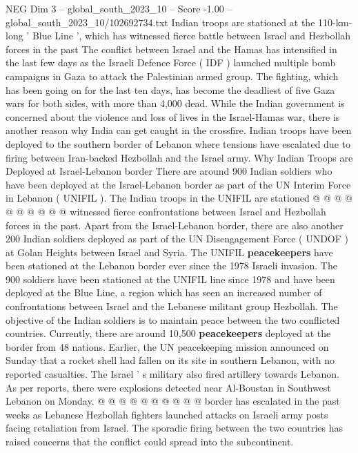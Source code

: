 \begin{textsample}{NEG Dim 3 – global\_south\_2023\_10 – Score -1.00 – global\_south\_2023\_10/102692734.txt}  \label{ex:f3_neg_021}
Indian troops are stationed at the 110-km-long ' Blue Line ', which has witnessed fierce battle between Israel and Hezbollah forces in the past The conflict between Israel and the Hamas has intensified in the last few days as the Israeli Defence Force ( IDF ) launched multiple bomb campaigns in Gaza to attack the Palestinian armed group.
The fighting, which has been going on for the last ten days, has become the deadliest of five Gaza wars for both sides, with more than 4,000 dead.
While the Indian government is concerned about the violence and loss of lives in the Israel-Hamas war, there is another reason why India can get caught in the crossfire.
Indian troops have been deployed to the southern border of Lebanon where tensions have escalated due to firing between Iran-backed Hezbollah and the Israel army.
Why Indian Troops are Deployed at Israel-Lebanon border There are around 900 Indian soldiers who have been deployed at the Israel-Lebanon border as part of the UN Interim Force in Lebanon ( UNIFIL ).
The Indian troops in the UNIFIL are stationed @ @ @ @ @ @ @ @ @ @ witnessed fierce confrontations between Israel and Hezbollah forces in the past.
Apart from the Israel-Lebanon border, there are also another 200 Indian soldiers deployed as part of the UN Disengagement Force ( UNDOF ) at Golan Heights between Israel and Syria.
The UNIFIL \textbf{peacekeepers} have been stationed at the Lebanon border ever since the 1978 Israeli invasion.
The 900 soldiers have been stationed at the UNIFIL line since 1978 and have been deployed at the Blue Line, a region which has seen an increased number of confrontations between Israel and the Lebanese militant group Hezbollah.
The objective of the Indian soldiers is to maintain peace between the two conflicted countries.
Currently, there are around 10,500 \textbf{peacekeepers} deployed at the border from 48 nations.
Earlier, the UN peacekeeping mission announced on Sunday that a rocket shell had fallen on its site in southern Lebanon, with no reported casualties.
The Israel ' s military also fired artillery towards Lebanon.
As per reports, there were explosions detected near Al-Boustan in Southwest Lebanon on Monday. @ @ @ @ @ @ @ @ @ @ border has escalated in the past weeks as Lebanese Hezbollah fighters launched attacks on Israeli army posts facing retaliation from Israel.
The sporadic firing between the two countries has raised concerns that the conflict could spread into the subcontinent.

\end{textsample}
